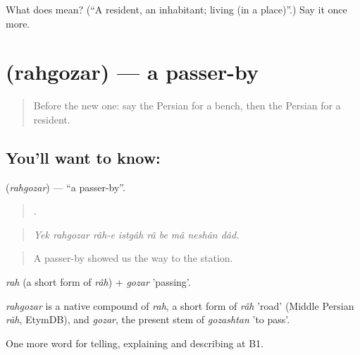 \begin{tcolorbox}[breakable,colback=teal!4,colframe=teal!35!black,title={Before you move on}]
What does  mean? (\textquotedblleft{}A resident, an inhabitant; living (in a place)\textquotedblright{}.) Say it once more.
\end{tcolorbox}
\section[\texorpdfstring{\fa{رهگذر} (rahgozar)}{رهگذر (rahgozar)}]{ (rahgozar) — a passer-by}

\label{lesson:FA-C451-rahgozar}



\begin{quote}
Before the new one: say the Persian for a bench, then the Persian for a resident.
\end{quote}

\subsection*{You'll want to know: }
\textbf{} (\emph{rahgozar}) — \textquotedblleft{}a passer-by\textquotedblright{}.

\begin{quote}
        .
\end{quote}

\begin{quote}
\emph{Yek rahgozar râh-e istgâh râ be mâ neshân dâd.}
\end{quote}

\begin{quote}
A passer-by showed us the way to the station.
\end{quote}

\emph{rah} (a short form of \emph{râh}) + \emph{gozar} 'passing'.

\begin{cousinweb}
\emph{rahgozar} is a native compound of \emph{rah}, a short form of \emph{râh} 'road' (Middle Persian \emph{rāh}, EtymDB), and \emph{gozar}, the present stem of \emph{gozashtan} 'to pass'.
\end{cousinweb}

\begin{grammarlens}[title={What you've built}]
One more word for telling, explaining and describing at B1.
\end{grammarlens}


